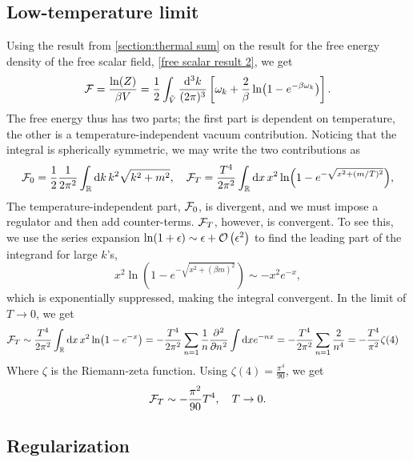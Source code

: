 \subsection*{Low-temperature limit}

Using the result from \autoref{section:thermal sum} on the result for the free energy density of the free scalar field, \autoref{free scalar result 2}, we get
\begin{equation}
    \label{free scalar free enrgy}
    \mathcal{F} = \frac{\ln(Z)}{\beta V}
    = \frac{1}{2} \int_{\tilde V} \frac{\dd^3 k}{(2 \pi)^3}
    \left[
        \omega_k + \frac{2}{\beta }\ln(1 - e^{-\beta\omega_k})
    \right].
\end{equation}
The free energy thus has two parts; the first part is dependent on temperature, the other is a temperature-independent vacuum contribution.
Noticing that the integral is spherically symmetric, we may write the two contributions as
\begin{equation}
    \mathcal{F}_0 = \frac{1}{2} \frac{1}{2 \pi^2}\int_{\mathbb{R}} \dd k \, k^2 \sqrt{k^2 + m^2}, \quad
    \mathcal{F}_T = \frac{T^4}{2 \pi^2}\int_{\mathbb{R}} \dd x \, x^2  \ln(1 - e^{-\sqrt{x^2 + (m/T)^2}}), 
\end{equation}
The temperature-independent part, $\mathcal{F}_0$, is divergent, and we must impose a regulator and then add counter-terms.
$\mathcal{F}_T$, however, is convergent. 
To see this, we use the series expansion $\ln(1 + \epsilon) \sim \epsilon + \mathcal{O}\left(\epsilon^{2}\right)$ to find the leading part of the integrand for large $k$'s, 
\begin{equation}
    x^2 \ln(1 - e^{-\sqrt{x^2 + (\beta m)^2}}) \sim - x^2 e^{-x}, 
\end{equation}
which is exponentially suppressed, making the integral convergent.
In the limit of $T \rightarrow 0$, we get
\begin{align}
    \nonumber
    \Ef_T & \sim 
    \frac{T^4}{2 \pi^2} \int_\R \dd x \, x^2 \ln(1 - e^{-x})
    = - \frac{T^4}{2 \pi^2} \sum_{n=1} \frac{1}{n} \diffp[2]{}{n} \int \dd x e^{-nx}
    = - \frac{T^4}{2 \pi^2} \sum_{n=1} \frac{2}{n^4}
    = - \frac{T^4}{\pi^2} \zeta(4)
\end{align}
Where $\zeta$ is the Riemann-zeta function.
Using $\zeta(4) = \frac{\pi^4}{90}$, we get
\begin{equation}
    \mathcal{F}_T \sim - \frac{\pi^2}{90} T^4, \quad T \rightarrow 0.
\end{equation}

\subsection*{Regularization}
\label{section: regualting free energy}

